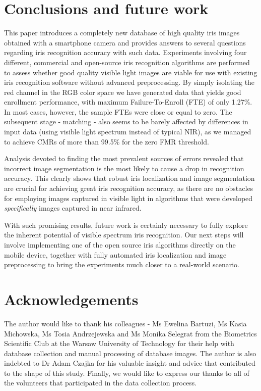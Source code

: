 \documentclass[10pt,twocolumn,letterpaper]{article}
\begin{document}
\section{Conclusions and future work}
This paper introduces a completely new database of high quality iris images obtained with a smartphone camera and provides answers to several questions regarding iris recognition accuracy with such data. Experiments involving four different, commercial and open-source iris recognition algorithms are performed to assess whether good quality visible light images are viable for use with existing iris recognition software without advanced preprocessing. By simply isolating the red channel in the RGB color space we have generated data that  yields good enrollment performance, with maximum Failure-To-Enroll (FTE) of only 1.27\%. In most cases, however, the sample FTEs were close or equal to zero. The subsequent stage - matching - also seems to be barely affected by differences in input data (using visible light spectrum instead of typical NIR), as we managed to achieve CMRs of more than 99.5\% for the zero FMR threshold.

Analysis devoted to finding the most prevalent sources of errors revealed that incorrect image segmentation is the most likely to cause a drop in recognition accuracy. This clearly shows that robust iris localization and image segmentation are crucial for achieving great iris recognition accuracy, as there are no obstacles for employing images captured in visible light in algorithms that were developed \emph{specifically} images captured in near infrared. 

With such promising results, future work is certainly necessary to fully explore the inherent potential of visible spectrum iris recognition. Our next steps will involve implementing one of the open source iris algorithms directly on the mobile device, together with fully automated iris localization and image preprocessing to bring the experiments much closer to a real-world scenario.

\section*{Acknowledgements}
The author would like to thank his colleagues - Ms Ewelina Bartuzi, Ms Kasia Michowska, Ms Tosia Andrzejewska and Ms Monika Selegrat from the Biometrics Scientific Club at the Warsaw University of Technology for their help with database collection and manual processing of database images. The author is also indebted to Dr Adam Czajka for his valuable insight and advice that contributed to the shape of this study. Finally, we would like to express our thanks to all of the volunteers that participated in the data collection process. 

{\small


}
\end{document}
